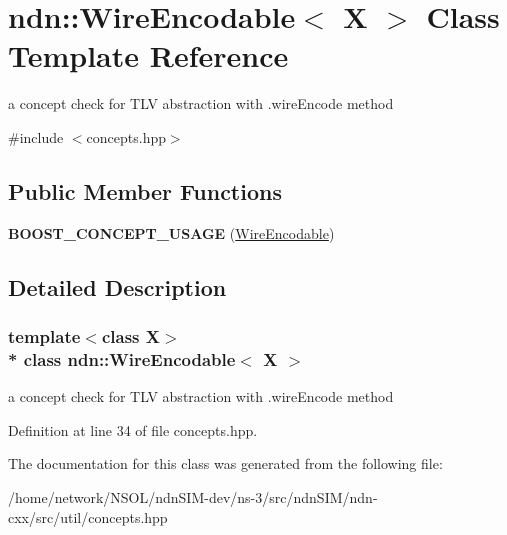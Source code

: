 \hypertarget{classndn_1_1WireEncodable}{}\section{ndn\+:\+:Wire\+Encodable$<$ X $>$ Class Template Reference}
\label{classndn_1_1WireEncodable}


a concept check for T\+LV abstraction with .wire\+Encode method  




{\ttfamily \#include $<$concepts.\+hpp$>$}

\subsection*{Public Member Functions}
\begin{DoxyCompactItemize}
\item 
{\bfseries B\+O\+O\+S\+T\+\_\+\+C\+O\+N\+C\+E\+P\+T\+\_\+\+U\+S\+A\+GE} (\hyperlink{classndn_1_1WireEncodable}{Wire\+Encodable})\hypertarget{classndn_1_1WireEncodable_a02f75e1561c5de9bfb392b91d2f58abb}{}\label{classndn_1_1WireEncodable_a02f75e1561c5de9bfb392b91d2f58abb}

\end{DoxyCompactItemize}


\subsection{Detailed Description}
\subsubsection*{template$<$class X$>$\\*
class ndn\+::\+Wire\+Encodable$<$ X $>$}

a concept check for T\+LV abstraction with .wire\+Encode method 

Definition at line 34 of file concepts.\+hpp.



The documentation for this class was generated from the following file\+:\begin{DoxyCompactItemize}
\item 
/home/network/\+N\+S\+O\+L/ndn\+S\+I\+M-\/dev/ns-\/3/src/ndn\+S\+I\+M/ndn-\/cxx/src/util/concepts.\+hpp\end{DoxyCompactItemize}
